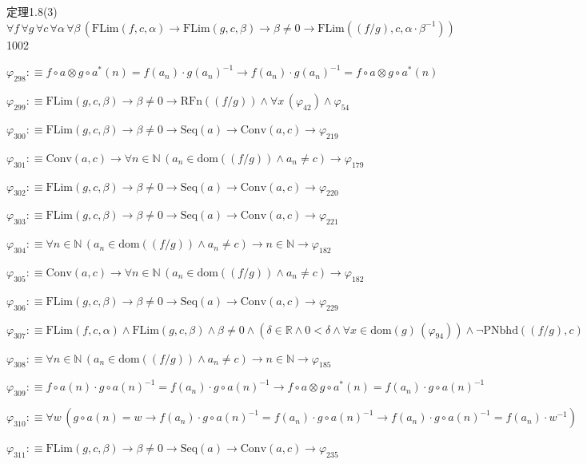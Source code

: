 \begin{fullproof}{定理1.8(3)}{$\forall f\,\forall g\,\forall c\,\forall \alpha\,\forall \beta\,(\mathrm{FLim}(f,c,\alpha) \to \mathrm{FLim}(g,c,\beta) \to \beta \neq 0 \to \mathrm{FLim}((f / g),c,\alpha \cdot \beta^{-1}))$}{1002}
\begin{abbrevlist}
\item $\varphi_{298} :\equiv f \circ a \otimes g \circ a^{\ast}(n) = f(a_{n}) \cdot g(a_{n})^{-1} \to f(a_{n}) \cdot g(a_{n})^{-1} = f \circ a \otimes g \circ a^{\ast}(n)$
\item $\varphi_{299} :\equiv \mathrm{FLim}(g,c,\beta) \to \beta \neq 0 \to \mathrm{RFn}((f / g)) \land \forall x\,(\varphi_{42}) \land \varphi_{54}$
\item $\varphi_{300} :\equiv \mathrm{FLim}(g,c,\beta) \to \beta \neq 0 \to \mathrm{Seq}(a) \to \mathrm{Conv}(a,c) \to \varphi_{219}$
\item $\varphi_{301} :\equiv \mathrm{Conv}(a,c) \to \forall n \in \mathbb{N}\,(a_{n} \in \mathrm{dom}((f / g)) \land a_{n} \neq c) \to \varphi_{179}$
\item $\varphi_{302} :\equiv \mathrm{FLim}(g,c,\beta) \to \beta \neq 0 \to \mathrm{Seq}(a) \to \mathrm{Conv}(a,c) \to \varphi_{220}$
\item $\varphi_{303} :\equiv \mathrm{FLim}(g,c,\beta) \to \beta \neq 0 \to \mathrm{Seq}(a) \to \mathrm{Conv}(a,c) \to \varphi_{221}$
\item $\varphi_{304} :\equiv \forall n \in \mathbb{N}\,(a_{n} \in \mathrm{dom}((f / g)) \land a_{n} \neq c) \to n \in \mathbb{N} \to \varphi_{182}$
\item $\varphi_{305} :\equiv \mathrm{Conv}(a,c) \to \forall n \in \mathbb{N}\,(a_{n} \in \mathrm{dom}((f / g)) \land a_{n} \neq c) \to \varphi_{182}$
\item $\varphi_{306} :\equiv \mathrm{FLim}(g,c,\beta) \to \beta \neq 0 \to \mathrm{Seq}(a) \to \mathrm{Conv}(a,c) \to \varphi_{229}$
\item $\varphi_{307} :\equiv \mathrm{FLim}(f,c,\alpha) \land \mathrm{FLim}(g,c,\beta) \land \beta \neq 0 \land (\delta \in \mathbb{R} \land 0 < \delta \land \forall x \in \mathrm{dom}(g)\,(\varphi_{94})) \land \neg \mathrm{PNbhd}((f / g),c)$
\item $\varphi_{308} :\equiv \forall n \in \mathbb{N}\,(a_{n} \in \mathrm{dom}((f / g)) \land a_{n} \neq c) \to n \in \mathbb{N} \to \varphi_{185}$
\item $\varphi_{309} :\equiv f \circ a(n) \cdot g \circ a(n)^{-1} = f(a_{n}) \cdot g \circ a(n)^{-1} \to f \circ a \otimes g \circ a^{\ast}(n) = f(a_{n}) \cdot g \circ a(n)^{-1}$
\item $\varphi_{310} :\equiv \forall w\,(g \circ a(n) = w \to f(a_{n}) \cdot g \circ a(n)^{-1} = f(a_{n}) \cdot g \circ a(n)^{-1} \to f(a_{n}) \cdot g \circ a(n)^{-1} = f(a_{n}) \cdot w^{-1})$
\item $\varphi_{311} :\equiv \mathrm{FLim}(g,c,\beta) \to \beta \neq 0 \to \mathrm{Seq}(a) \to \mathrm{Conv}(a,c) \to \varphi_{235}$

\end{abbrevlist}
\end{fullproof}
